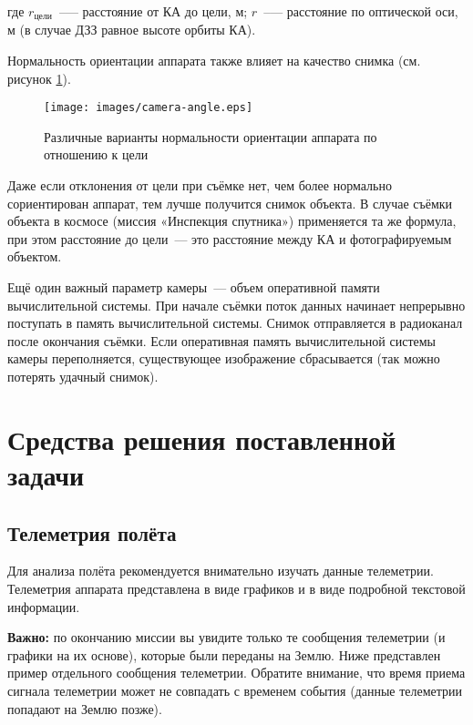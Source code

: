 \documentclass[12pt,a4paper]{article}
\begin{document}
где $r_{\text{цели}}$~--— расстояние от КА до цели, м; $r$~--— расстояние по оптической
оси, м (в случае ДЗЗ равное высоте орбиты КА).

Нормальность ориентации аппарата также влияет на качество снимка (см. рисунок
\ref{Pic:Camera-Angle}).

\begin{figure}[tbh]
  \begin{center}
    \texttt{[image: images/camera-angle.eps]}
    \caption{Различные варианты нормальности ориентации аппарата по отношению к цели}
    \label{Pic:Camera-Angle}
  \end{center}
\end{figure}

Даже если отклонения от цели при съёмке нет, чем более нормально сориентирован аппарат, тем лучше получится снимок объекта.
В случае съёмки объекта в космосе (миссия «Инспекция спутника») применяется та же формула,
при этом расстояние до цели~--- это расстояние между КА и фотографируемым объектом.

Ещё один важный параметр камеры~--- объем оперативной памяти вычислительной системы. При
начале съёмки поток данных начинает непрерывно поступать в память вычислительной
системы. Снимок отправляется в радиоканал после окончания съёмки. Если оперативная память
вычислительной системы камеры переполняется, существующее изображение сбрасывается (так
можно потерять удачный снимок).

\section{Средства решения поставленной задачи}

\subsection{Телеметрия полёта}
\label{Sec:Telemetry}

Для анализа полёта рекомендуется внимательно изучать данные телеметрии. Телеметрия
аппарата представлена в виде графиков и в виде подробной текстовой информации.

\textbf{Важно:} по окончанию миссии вы увидите только те сообщения телеметрии (и графики
на их основе), которые были переданы на Землю. Ниже представлен пример отдельного
сообщения телеметрии. Обратите внимание, что время приема сигнала телеметрии может не
совпадать с временем события (данные телеметрии попадают на Землю позже).
\end{document}
